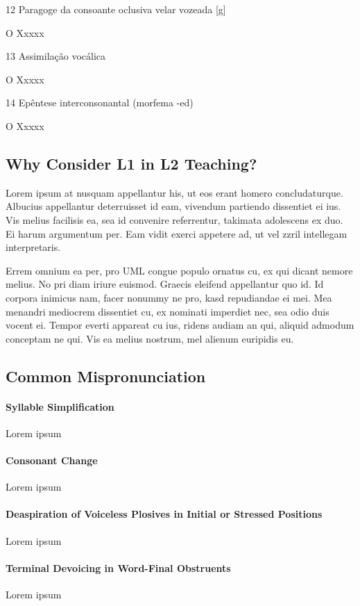 12 Paragoge da consoante oclusiva velar vozeada {[}g{]}

O Xxxxx

13 Assimila\c{c}\~ao voc\'alica

O Xxxxx

14 Ep\^entese interconsonantal (morfema -ed)

O Xxxxx


\subsection{Why Consider L1 in L2 Teaching?}

Lorem ipsum at nusquam appellantur his, ut eos erant homero
concludaturque. Albucius appellantur deterruisset id eam, vivendum
partiendo dissentiet ei ius. Vis melius facilisis ea, sea id convenire
referrentur, takimata adolescens ex duo. Ei harum argumentum per. Eam
vidit exerci appetere ad, ut vel zzril intellegam interpretaris.

Errem omnium ea per, pro \ac{UML} congue populo ornatus cu, ex qui
dicant nemore melius. No pri diam iriure euismod. Graecis eleifend
appellantur quo id. Id corpora inimicus nam, facer nonummy ne pro,
kasd repudiandae ei mei. Mea menandri mediocrem dissentiet cu, ex
nominati imperdiet nec, sea odio duis vocent ei. Tempor everti
appareat cu ius, ridens audiam an qui, aliquid admodum conceptam ne
qui. Vis ea melius nostrum, mel alienum euripidis eu.

\subsection{Common Mispronunciation}\label{sec:common-mispronunciation}

\paragraph{Syllable Simplification}
Lorem ipsum

\paragraph{Consonant Change}
Lorem ipsum

\paragraph{Deaspiration of Voiceless Plosives in Initial or Stressed Positions}
Lorem ipsum

\paragraph{Terminal Devoicing in Word-Final Obstruents}
Lorem ipsum

